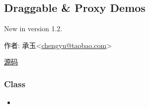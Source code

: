 \documentclass[letterpaper,10pt,english]{sphinxmanual}
\begin{document}
\subsection{Draggable \& Proxy Demos}
\label{demo/component/dd/draggable:draggable-proxy-demos}\label{demo/component/dd/draggable::doc}New in version 1.2.
\begin{DUlineblock}{0em}
\item[] 作者: 承玉\textless{}\href{mailto:chengyu@taobao.com}{chengyu@taobao.com}\textgreater{}
\item[] \href{https://github.com/kissyteam/kissy/tree/master/src/dd/draggable.js}{源码}
\end{DUlineblock}


\subsubsection{Class}
\label{demo/component/dd/draggable:class}\begin{itemize}
\item {}
{\hyperref[api/component/dd/draggable:Draggable.Draggable]{}}

\end{itemize}
\end{document}
